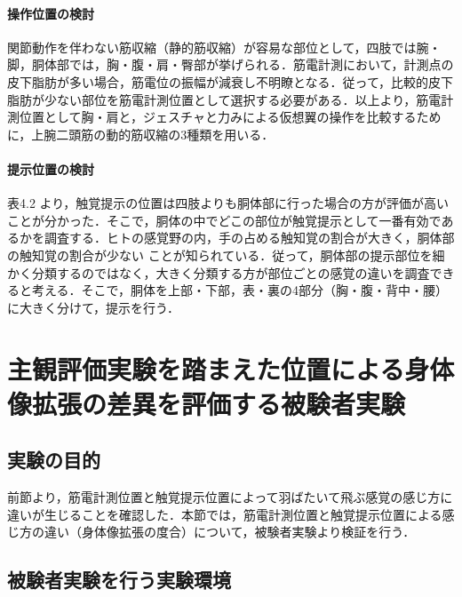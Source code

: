 \begin{small}
    \paragraph{操作位置の検討} %
      関節動作を伴わない筋収縮（静的筋収縮）が容易な部位として，四肢では腕・脚，胴体部では，胸・腹・肩・臀部が挙げられる．筋電計測において，計測点の皮下脂肪が多い場合，筋電位の振幅が減衰し不明瞭となる\cite{白石恵1992筋電位多点計測による体幹背部の神経支配帯の分布}．従って，比較的皮下脂肪が少ない部位を筋電計測位置として選択する必要がある．以上より，筋電計測位置として胸・肩と，ジェスチャと力みによる仮想翼の操作を比較するために，上腕二頭筋の動的筋収縮の3種類を用いる．


    \paragraph{提示位置の検討} %
      表4.2
      より，触覚提示の位置は四肢よりも胴体部に行った場合の方が評価が高いことが分かった．そこで，胴体の中でどこの部位が触覚提示として一番有効であるかを調査する．ヒトの感覚野の内，手の占める触知覚の割合が大きく\cite{penfield1950cerebral}，胴体部の触知覚の割合が少ない
      ことが知られている．従って，胴体部の提示部位を細かく分類するのではなく，大きく分類する方が部位ごとの感覚の違いを調査できると考える．そこで，胴体を上部・下部，表・裏の4部分（胸・腹・背中・腰）に大きく分けて，提示を行う．        


\section{主観評価実験を踏まえた位置による身体像拡張の差異を評価する被験者実験}
        
  \subsection{実験の目的}
    前節より，筋電計測位置と触覚提示位置によって羽ばたいて飛ぶ感覚の感じ方に違いが生じることを確認した．本節では，筋電計測位置と触覚提示位置による感じ方の違い（身体像拡張の度合）について，被験者実験より検証を行う．

  \subsection{被験者実験を行う実験環境}


\end{small}

